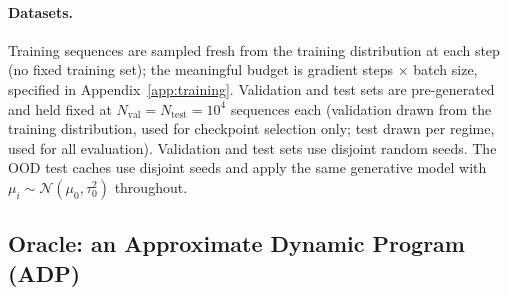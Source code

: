 \documentclass[11pt]{article}
\begin{document}
\begin{center}
\small
{}
\end{center}

\paragraph{Datasets.} Training sequences are sampled fresh from the training distribution at each step (no fixed training set); the meaningful budget is gradient steps $\times$ batch size, specified in Appendix~\ref{app:training}. Validation and test sets are pre-generated and held fixed at $N_{\mathrm{val}} = N_{\mathrm{test}} = 10^4$ sequences each (validation drawn from the training distribution, used for checkpoint selection only; test drawn per regime, used for all evaluation). Validation and test sets use disjoint random seeds. The OOD test caches use disjoint seeds and apply the same generative model with $\mu_i \sim \mathcal{N}(\mu_0, \tau_0^2)$ throughout.

\subsection{Oracle: an Approximate Dynamic Program (ADP)}
\label{sec:oracle}
\end{document}
